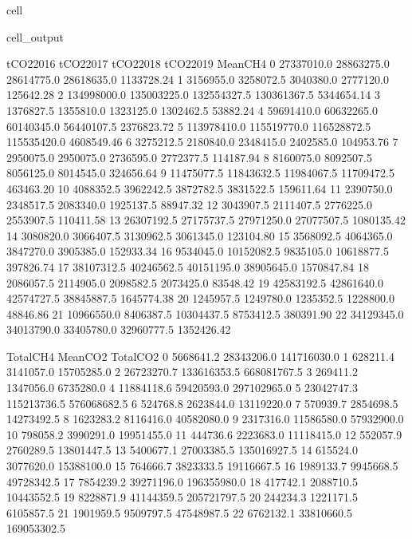 \documentclass[letterpaper,10pt,english]{jupyterBook}
\begin{document}
\begin{sphinxuseclass}{cell}
\begin{sphinxVerbatimOutput}
\begin{sphinxuseclass}{cell_output}
\begin{sphinxVerbatim}[commandchars=\\\{\}]
      tCO2\PYGZus{}2016    tCO2\PYGZus{}2017    tCO2\PYGZus{}2018    tCO2\PYGZus{}2019    Mean\PYGZus{}CH4  \PYGZbs{}
0    27337010.0   28863275.0   28614775.0   28618635.0  1133728.24   
1     3156955.0    3258072.5    3040380.0    2777120.0   125642.28   
2   134998000.0  135003225.0  132554327.5  130361367.5  5344654.14   
3     1376827.5    1355810.0    1323125.0    1302462.5    53882.24   
4    59691410.0   60632265.0   60140345.0   56440107.5  2376823.72   
5   113978410.0  115519770.0  116528872.5  115535420.0  4608549.46   
6     3275212.5    2180840.0    2348415.0    2402585.0   104953.76   
7     2950075.0    2950075.0    2736595.0    2772377.5   114187.94   
8     8160075.0    8092507.5    8056125.0    8014545.0   324656.64   
9    11475077.5   11843632.5   11984067.5   11709472.5   463463.20   
10    4088352.5    3962242.5    3872782.5    3831522.5   159611.64   
11    2390750.0    2348517.5    2083340.0    1925137.5    88947.32   
12    3043907.5    2111407.5    2776225.0    2553907.5   110411.58   
13   26307192.5   27175737.5   27971250.0   27077507.5  1080135.42   
14    3080820.0    3066407.5    3130962.5    3061345.0   123104.80   
15    3568092.5    4064365.0    3847270.0    3905385.0   152933.34   
16    9534045.0   10152082.5    9835105.0   10618877.5   397826.74   
17   38107312.5   40246562.5   40151195.0   38905645.0  1570847.84   
18    2086057.5    2114905.0    2098582.5    2073425.0    83548.42   
19   42583192.5   42861640.0   42574727.5   38845887.5  1645774.38   
20    1245957.5    1249780.0    1235352.5    1228800.0    48846.86   
21   10966550.0    8406387.5   10304437.5    8753412.5   380391.90   
22   34129345.0   34013790.0   33405780.0   32960777.5  1352426.42   

     Total\PYGZus{}CH4     Mean\PYGZus{}CO2    Total\PYGZus{}CO2  
0    5668641.2   28343206.0  141716030.0  
1     628211.4    3141057.0   15705285.0  
2   26723270.7  133616353.5  668081767.5  
3     269411.2    1347056.0    6735280.0  
4   11884118.6   59420593.0  297102965.0  
5   23042747.3  115213736.5  576068682.5  
6     524768.8    2623844.0   13119220.0  
7     570939.7    2854698.5   14273492.5  
8    1623283.2    8116416.0   40582080.0  
9    2317316.0   11586580.0   57932900.0  
10    798058.2    3990291.0   19951455.0  
11    444736.6    2223683.0   11118415.0  
12    552057.9    2760289.5   13801447.5  
13   5400677.1   27003385.5  135016927.5  
14    615524.0    3077620.0   15388100.0  
15    764666.7    3823333.5   19116667.5  
16   1989133.7    9945668.5   49728342.5  
17   7854239.2   39271196.0  196355980.0  
18    417742.1    2088710.5   10443552.5  
19   8228871.9   41144359.5  205721797.5  
20    244234.3    1221171.5    6105857.5  
21   1901959.5    9509797.5   47548987.5  
22   6762132.1   33810660.5  169053302.5  
\end{sphinxVerbatim}

\end{sphinxuseclass}\end{sphinxVerbatimOutput}

\end{sphinxuseclass}
\end{document}
